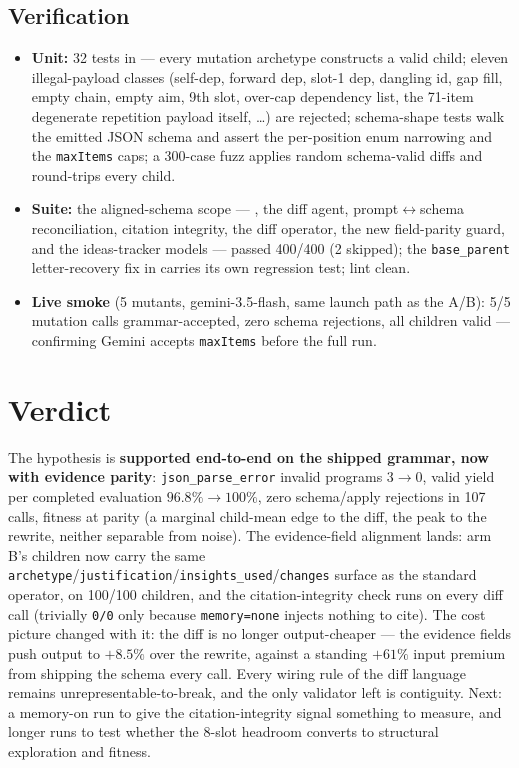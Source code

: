 \documentclass[11pt]{article}
\newcommand{\armB}{\textcolor{accent}{arm B}}
\begin{document}
\subsection{Verification}
\begin{itemize}
  \item \textbf{Unit:} 32 tests in  --- every mutation
  archetype constructs a valid child; eleven illegal-payload classes (self-dep, forward dep,
  slot-1 dep, dangling id, gap fill, empty chain, empty aim, 9th slot, over-cap dependency
  list, the 71-item degenerate repetition payload itself, \dots) are rejected; schema-shape
  tests walk the emitted JSON schema and assert the per-position enum narrowing and the
  \texttt{maxItems} caps; a 300-case fuzz applies random schema-valid diffs and round-trips
  every child.
  \item \textbf{Suite:} the aligned-schema scope --- , the diff agent,
  prompt$\leftrightarrow$schema reconciliation, citation integrity, the diff operator, the new
   field-parity guard, and the ideas-tracker
  models --- passed 400/400 (2 skipped); the \texttt{base\_parent} letter-recovery fix in
   carries its own regression test; lint clean.
  \item \textbf{Live smoke} (5 mutants, gemini-3.5-flash, same launch path as the A/B):
  5/5 mutation calls grammar-accepted, zero schema rejections, all children valid ---
  confirming Gemini accepts \texttt{maxItems} before the full run.
\end{itemize}

\section{Verdict}
The hypothesis is \textbf{supported end-to-end on the shipped grammar, now with evidence
parity}: \texttt{json\_parse\_error} invalid programs $3\to0$, valid yield per completed
evaluation $96.8\%\to100\%$, zero schema/apply rejections in 107 calls, fitness at parity
(a marginal child-mean edge to the diff, the peak to the rewrite, neither separable from
noise). The evidence-field alignment lands: \armB's children now carry the same
\texttt{archetype}/\texttt{justification}/\texttt{insights\_used}/\texttt{changes} surface as
the standard operator, on 100/100 children, and the citation-integrity check runs on every
diff call (trivially \texttt{0/0} only because \texttt{memory=none} injects nothing to
cite). The cost picture changed with it: the diff is no longer output-cheaper --- the
evidence fields push output to $+8.5\%$ over the rewrite, against a standing $+61\%$ input
premium from shipping the schema every call. Every wiring rule of the diff language remains
unrepresentable-to-break, and the only validator left is contiguity. Next: a memory-on run
to give the citation-integrity signal something to measure, and longer runs to test whether
the 8-slot headroom converts to structural exploration and fitness.
\end{document}
